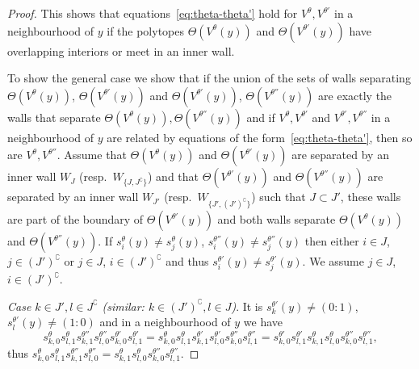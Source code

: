 \documentclass[10pt,a4paper]{amsart}
\theoremstyle{definition}
\begin{document}
\begin{proof}
This shows that equations~\eqref{eq:theta-theta'} hold for $V^\theta,V^{\theta'}$
in a neighbourhood of $y$ if the polytopes $\Theta(V^\theta(y))$ and 
$\Theta(V^{\theta'}(y))$ have overlapping interiors or meet in an inner wall.

To show the general case we show that if the union of the sets of walls separating
$\Theta(V^\theta(y))$, $\Theta(V^{\theta'}(y))$ and 
$\Theta(V^{\theta'}(y))$, $\Theta(V^{\theta''}(y))$ are exactly the walls that separate 
$\Theta(V^\theta(y)),\Theta(V^{\theta''}(y))$ and if $V^\theta,V^{\theta'}$ and
$V^{\theta'},V^{\theta''}$ in a neighbourhood of $y$ are related by equations of 
the form~\eqref{eq:theta-theta'}, then so are $V^\theta,V^{\theta''}$.
Assume that $\Theta(V^\theta(y))$ and $\Theta(V^{\theta'}(y))$ are separated by an
inner wall $W_J$ (resp.\ $W_{\{J,J^\complement\}}$) and that $\Theta(V^{\theta'}(y))$ 
and $\Theta(V^{\theta''}(y))$ are separated by an inner wall $W_{J'}$ (resp.\ 
$W_{\{J',(J')^\complement\}}$) such that $J\subset J'$, these walls are part 
of the boundary of $\Theta(V^{\theta'}(y))$ and both walls separate 
$\Theta(V^\theta(y))$ and $\Theta(V^{\theta''}(y))$. 
If $s_i^\theta(y)\neq s_j^\theta(y)$, $s_i^{\theta''}(y)\neq s_j^{\theta''}(y)$
then either $i\in J$, $j\in(J')^\complement$ or $j\in J$, $i\in(J')^\complement$ 
and thus $s_i^{\theta'}(y)\neq s_j^{\theta'}(y)$. 
We assume $j\in J$, $i\in(J')^\complement$.

\emph{Case $k\in J',l\in J^\complement$ (similar: $k\in (J')^\complement,l\in J$)}.
It is $s^{\theta'}_k(y)\neq (0:1)$, $s^{\theta'}_l(y)\neq(1:0)$ and in 
a neighbourhood of $y$ we have 
\[
s^\theta_{k,0}s^\theta_{l,1}
s^{\theta''}_{k,1}s^{\theta''}_{l,0}s^{\theta'}_{k,0}s^{\theta'}_{l,1}
=s^\theta_{k,0}s^\theta_{l,1}
s^{\theta'}_{k,1}s^{\theta'}_{l,0}s^{\theta''}_{k,0}s^{\theta''}_{l,1}
=s^{\theta'}_{k,0}s^{\theta'}_{l,1}s^\theta_{k,1}s^\theta_{l,0}
s^{\theta''}_{k,0}s^{\theta''}_{l,1},
\]
thus 
$s^\theta_{k,0}s^\theta_{l,1}s^{\theta''}_{k,1}s^{\theta''}_{l,0}
=s^\theta_{k,1}s^\theta_{l,0}s^{\theta''}_{k,0}s^{\theta''}_{l,1}$.


\end{proof}
\end{document}
